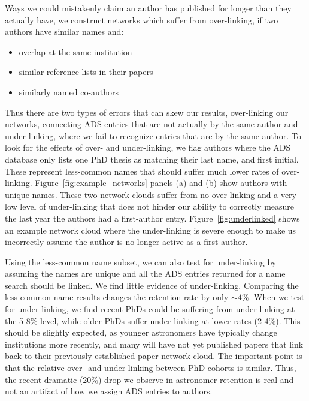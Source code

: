 \documentclass[preprint2]{aastex}
\begin{document}
Ways we could mistakenly claim an author has published for longer than they actually have, we construct networks which suffer from over-linking, if two authors have similar names and:
\begin{itemize}
\item{overlap at the same institution}
\item{similar reference lists in their papers}
  \item{similarly named co-authors}
\end{itemize}

Thus there are two types of errors that can skew our results, over-linking our networks, connecting ADS entries that are not actually by the same author and under-linking, where we fail to recognize entries that are by the same author.  To look for the effects of over- and under-linking, we flag authors where the ADS database only lists one PhD thesis as matching their last name, and first initial. These represent less-common names that should suffer much lower rates of over-linking. Figure~\ref{fig:example_networks} panels (a) and (b) show authors with unique names. These two network clouds suffer from no over-linking and a very low level of under-linking that does not hinder our ability to correctly measure the last year the authors had a first-author entry.  Figure~\ref{fig:underlinked} shows an example network cloud where the under-linking is severe enough to make us incorrectly assume the author is no longer active as a first author.

Using the less-common name subset, we can also test for under-linking by assuming the names are unique and all the ADS entries returned for a name search should be linked.  We find little evidence of under-linking. Comparing the less-common name results changes the retention rate by only $\sim4$\%. When we test for under-linking, we find recent PhDs could be suffering from under-linking at the 5-8\% level, while older PhDs suffer under-linking at lower rates (2-4\%).  This should be slightly expected, as younger astronomers have typically change institutions more recently, and many will have not yet published papers that link back to their previously established paper network cloud.  The important point is that the relative over- and under-linking between PhD cohorts is similar.  Thus, the recent dramatic (20\%) drop we observe in astronomer retention is real and not an artifact of how we assign ADS entries to authors.

\end{document}
